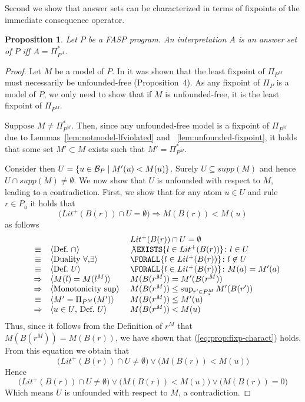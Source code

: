 \documentclass{tlp}
\newcommand{\hbase}[1]{{\ensuremath{{\cal B}_{#1}}}}
\newcommand{\body}[1]{\ensuremath{B(#1)}}
\newcommand{\poslit}[1]{\ensuremath{Lit^{+}(#1)}}
\newcommand{\posbody}[1]{\ensuremath{\poslit{\body{#1}}}}
\newcommand{\supp}[1]{\ensuremath{\mathit{supp}(#1)}}
\newcommand{\nfimcons}[1]{\Pi_{#1}}
\newcommand{\lfpnfimcons}[1]{\nfimcons{#1}^{*}}
\newcommand{\SUCHTHAT}{\colon}
\newcommand{\Exists}[2]{\ensuremath{\EXISTS{#1} \SUCHTHAT {#2}}}
\newcommand{\Forall}[2]{\ensuremath{\FORALL{#1} \SUCHTHAT {#2}}}
\newtheorem{proposition}{Proposition}
\newcommand{\imp}{\Rightarrow}
\begin{document}
Second we show that answer sets can be characterized in terms of fixpoints of the immediate consequence operator.



\begin{proposition}\label{prop:fixp-charact}
 Let $P$ be a FASP program. An interpretation $A$ is an answer set of $P$ iff $A = \lfpnfimcons{P^A}$.
\end{proposition}
\begin{proof}
 Let $M$ be a model of $P$.
 In \cite{FASP:amai} it was shown that the least fixpoint of $\nfimcons{P^M}$ must necessarily be unfounded-free (Proposition~4). As any fixpoint of $\nfimcons{P}$ is a model of $P$, we only need to show that if $M$ is unfounded-free, it is the least fixpoint of $\nfimcons{P^M}$.
 
 Suppose $M \neq \lfpnfimcons{P^M}$. Then, since any unfounded-free model is a fixpoint of $\nfimcons{P^M}$ due to Lemmas~\ref{lem:notmodel-lfviolated} and ~\ref{lem:unfounded-fixpoint}, it holds that some set $M' \subset M$ exists such that $M' = \lfpnfimcons{P^M}$.
 
 Consider then $U = \{ u \in \hbase{P} \mid M'(u) < M(u) \}$. Surely $U \subseteq \supp{M}$ and hence $U \cap \supp{M} \neq \emptyset$. We now show that $U$ is unfounded with respect to $M$, leading to a contradiction. First, we show that for any atom $u \in U$ and rule $r \in P_u$ it holds that 
  \begin{equation}\Big(\posbody{r} \cap U = \emptyset\Big) \imp M(\body{r}) < M(u)\label{eq:prop:fixp-charact}\end{equation}
 as follows
  \[\begin{array}{rcll}
   & & &\posbody{r} \cap U = \emptyset\\
    &\equiv& \hint{Def.~$\cap$}& \not\Exists{l \in \posbody{r}}{l \in U}\\
    &\equiv& \hint{Duality $\forall$,$\exists$}& \Forall{l \in \posbody{r}}{l \not\in U}\\
    &\equiv& \hint{Def.~$U$}& \Forall{l \in \posbody{r}}{M(a) = M'(a)}\\
    &\imp& \hint{$M(l) = M(l^M)$}& M(\body{r^M}) = M'(\body{r^M})\\
&\imp& \hint{Monotonicity $\sup$}& M(\body{r^M}) \leq \sup_{r' \in P^M_u} M'(\body{r'})\\
    &\equiv& \hint{$M' = \nfimcons{P^M}(M')$}& M(\body{r^M}) \leq M'(u)\\
    &\imp& \hint{$u \in U$, Def.~$U$}& M(\body{r^M}) < M(u)\\
\end{array}\]
\noindent Thus, since it follows from the Definition of $r^M$ that $M(\body{r^M}) = M(\body{r})$, we have shown that (\ref{eq:prop:fixp-charact}) holds. From this equation we obtain that
  $$\Big(\posbody{r} \cap U \neq \emptyset\Big) \vee \Big(M(\body{r}) < M(u)\Big)$$
 Hence
  $$\Big(\posbody{r} \cap U \neq \emptyset\Big) \vee \Big(M(\body{r}) < M(u)\Big) \vee \Big(M(\body{r}) = 0\Big)$$
 Which means $U$ is unfounded with respect to $M$, a contradiction.
\end{proof}
\end{document}
